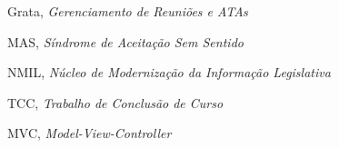 \begin{siglas}
	\item Grata, \textit{Gerenciamento de Reuniões e ATAs}
  	\item MAS, \textit{Síndrome de Aceitação Sem Sentido}
  	\item NMIL, \textit{Núcleo de Modernização da Informação Legislativa}
  	\item TCC, \textit{Trabalho de Conclusão de Curso}
  	\item MVC, \textit{Model-View-Controller}
\end{siglas}